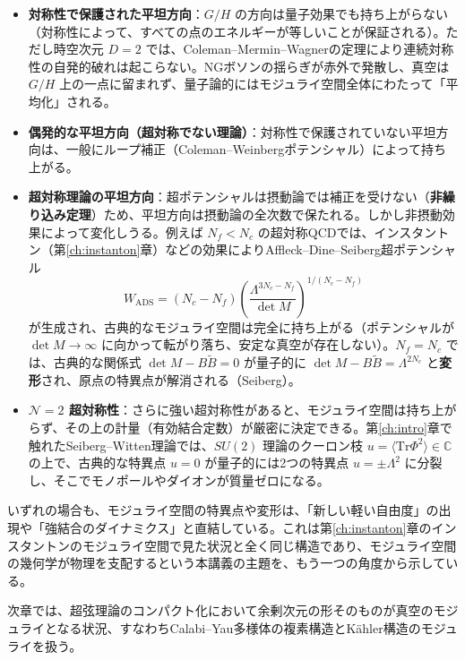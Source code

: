 \documentclass[uplatex, dvipdfmx, book]{jsbook}
\begin{document}
\begin{itemize}
    \item \textbf{対称性で保護された平坦方向}：$G/H$ の方向は量子効果でも持ち上がらない（対称性によって、すべての点のエネルギーが等しいことが保証される）。ただし時空次元 $D = 2$ では、Coleman--Mermin--Wagnerの定理\cite{coleman1973}により連続対称性の自発的破れは起こらない。NGボソンの揺らぎが赤外で発散し、真空は $G/H$ 上の一点に留まれず、量子論的にはモジュライ空間全体にわたって「平均化」される。
    \item \textbf{偶発的な平坦方向（超対称でない理論）}：対称性で保護されていない平坦方向は、一般にループ補正（Coleman--Weinbergポテンシャル）によって持ち上がる。
    \item \textbf{超対称理論の平坦方向}：超ポテンシャルは摂動論では補正を受けない（\textbf{非繰り込み定理}）ため、平坦方向は摂動論の全次数で保たれる。しかし非摂動効果によって変化しうる。例えば $N_f < N_c$ の超対称QCDでは、インスタントン（第\ref{ch:instanton}章）などの効果によりAffleck--Dine--Seiberg超ポテンシャル\cite{ads1984}
    \begin{equation}
        W_{\text{ADS}} = (N_c - N_f)\left( \frac{\Lambda^{3N_c - N_f}}{\det M} \right)^{1/(N_c - N_f)}
    \end{equation}
    が生成され、古典的なモジュライ空間は完全に持ち上がる（ポテンシャルが $\det M \to \infty$ に向かって転がり落ち、安定な真空が存在しない）。$N_f = N_c$ では、古典的な関係式 $\det M - B\tilde{B} = 0$ が量子的に $\det M - B\tilde{B} = \Lambda^{2N_c}$ と\textbf{変形}され、原点の特異点が解消される（Seiberg\cite{seiberg1994}）。
    \item \textbf{$\mathcal{N} = 2$ 超対称性}：さらに強い超対称性があると、モジュライ空間は持ち上がらず、その上の計量（有効結合定数）が厳密に決定できる。第\ref{ch:intro}章で触れたSeiberg--Witten理論では、$SU(2)$ 理論のクーロン枝 $u = \langle\mathrm{Tr}\Phi^2\rangle \in \mathbb{C}$ の上で、古典的な特異点 $u = 0$ が量子的には2つの特異点 $u = \pm\Lambda^2$ に分裂し、そこでモノポールやダイオンが質量ゼロになる。
\end{itemize}

いずれの場合も、モジュライ空間の特異点や変形は、「新しい軽い自由度」の出現や「強結合のダイナミクス」と直結している。これは第\ref{ch:instanton}章のインスタントンのモジュライ空間で見た状況と全く同じ構造であり、モジュライ空間の幾何学が物理を支配するという本講義の主題を、もう一つの角度から示している。

次章では、超弦理論のコンパクト化において余剰次元の形そのものが真空のモジュライとなる状況、すなわちCalabi--Yau多様体の複素構造とK\"ahler構造のモジュライを扱う。
\end{document}
